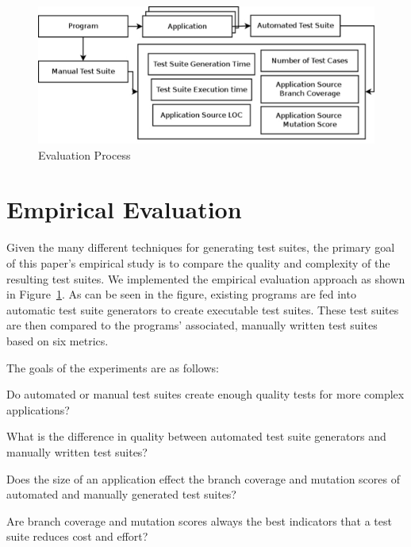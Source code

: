 
\begin{figure}[!t]
\centering
\captionsetup{justification=centering}
  \includegraphics[width=\linewidth]{proccess_diagram.pdf}
    \caption{Evaluation Process}
  \label{fig:process_diagram}
\end{figure}

\section{Empirical Evaluation}
\label{sec:evaluation}
Given the many different techniques for generating test suites, the primary goal of this paper's empirical study is to compare the quality and complexity of the resulting test suites.  We implemented the empirical evaluation approach as shown in Figure~\ref{fig:process_diagram}.  As can be seen in the figure, existing programs are fed into automatic test suite generators to create executable test suites.  These test suites are then compared to the programs' associated, manually written test suites based on six metrics.   

The goals of the experiments are as follows:
\squishlist
\item Do automated or manual test suites create enough quality tests for more complex applications?
\item What is the difference in quality between automated test suite generators and manually written test suites?
\item Does the size of an application  effect the branch coverage and mutation scores of automated and manually generated test suites?
\item Are branch coverage and mutation scores always the best indicators that a test suite reduces cost and effort?
\squishend

